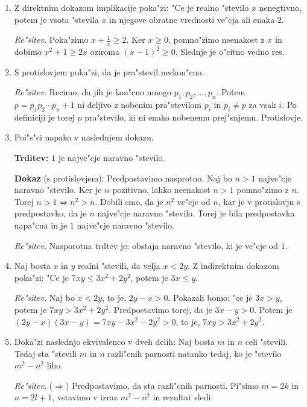 \documentclass[11pt,paper=b5,footinclude,headinclude]{scrbook} %
\begin{document}
\begin{enumerate}
\item Z direktnim dokazom implikacije poka"zi: "Ce je realno "stevilo $x$ nenegtivno, potem je vsota  "stevila $x$  in njegove obratne vrednosti  ve"cja ali enaka $2$.


\emph{ Re"sitev.} Poka"zimo $x + \frac{1}{x}\geq 2$. Ker $x\geq 0$, pomno"zimo neenakost z $x$ in dobimo
$x^2 + 1 \geq 2x$ oziroma $(x- 1)^2\geq 0$. Slednje je o"citno vedno res.

\item S protislovjem poka"zi, da je pra"stevil neskon"cno.

\emph{ Re"sitev.} Recimo, da jih je kon"cno mnogo $p_1,p_2,\ldots, p_n$. Potem  $p=p_1p_2\cdots p_n+1$ ni deljivo z nobenim pra"stevilom $p_i$ in $p_i\neq p$ za vsak $i$. Po definiciji je torej $p$ pra"stevilo, ki ni enako nobenemu prej"snjemu. Protislovje.

\item Poi"s"ci napako v naslednjem dokazu. 

\textbf{Trditev:} $1$ je najve"cje naravno "stevilo. 

\textbf{Dokaz} (s protislovjem):
Predpostavimo nasprotno. Naj bo $n>1$ najve"cje naravno "stevilo. Ker je $n$ pozitivno, lahko neenakost $n>1$ pomno"zimo z $n$. Torej $n>1\Leftrightarrow n^2>n$. Dobili smo, da je $n^2$ ve"cje od $n$, kar je v protislovju s predpostavko, da je $n$ najve"cje naravno "stevilo. Torej je bila predpostavka napa"cna in je $1$ najve"cje naravno "stevilo.

\emph{ Re"sitev.} Nasporotna trdtev je: obstaja naravno "stevilo, ki je ve"cje od $1$.


\item Naj bosta $x$ in $y$ realni "stevili, da velja $x<2y$. Z indirektnim dokazom poka"zi: "Ce je $7xy\leq 3x^2 + 2y^2$, potem je $3x\leq y$.

\emph{ Re"sitev.} Naj bo $x<2y$, to je, $2y-x>0$. Pokazali bomo: "ce je $3x> y$, potem je $7xy > 3x^2 + 2y^2$. Predpostavimo torej, da je $3x-y>0$. Potem je $(2y-x)(3x-y)= 7xy - 3x^2 - 2y^2>0$, to je, $7xy > 3x^2 + 2y^2$.

\item Doka"zi naslednjo ekvivalenco v dveh delih: Naj bosta $m$ in $n$ celi "stevili. Tedaj sta "stevili $m$ in $n$ razli"cnih parnosti natanko tedaj, ko je "stevilo $m^2- n^2$ liho.

\emph{ Re"sitev.} ($\Rightarrow$) Predpostavimo, da sta razli"cnih parnosti. Pi"simo  $m=2k$ in $n=2l+1$, vstavimo v izraz $m^2- n^2$ in rezultat sledi.


\end{enumerate}
\end{document}
